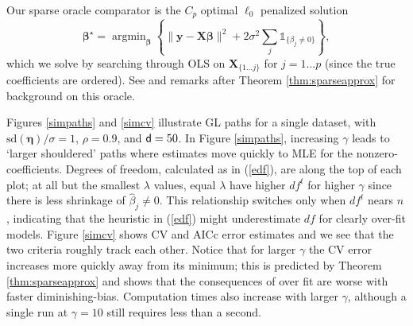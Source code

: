 \documentclass[12pt]{article}
\newcommand{\bs}[1]{\boldsymbol{#1}}
\newcommand{\mr}[1]{\mathrm{#1}}
\newcommand{\bm}[1]{\mathbf{#1}}
\newcommand{\ds}[1]{\mathds{#1}}
\DeclareMathOperator*{\argmin}{argmin}
\begin{document}
Our sparse oracle comparator is the $C_p$ optimal $\ell_0$ penalized solution
\begin{equation}\label{l0oracle}
\bs{\beta}^{\star} = \argmin_{\bs{\beta}} \left\{ \|\bm{y}-\bm{X}\bs{\beta}\|^2 + 2\sigma^2\sum_j
\ds{1}_{\{\beta_j\neq0\}}\right\},
\end{equation} which we solve by searching through
OLS on $\bm{X}_{\{1\ldots j\}}$ for $j=1\ldots p$ (since the true coefficients are ordered).
See \cite{mallows_comments_1973} and remarks after Theorem \ref{thm:sparseapprox} for background on this oracle.


Figures \ref{simpaths} and \ref{simcv} illustrate GL paths for a single
dataset, with  $\mr{sd}(\bm{\eta})/\sigma=1$, $\rho=0.9$, and ${\sf d}=50$. In Figure
\ref{simpaths}, increasing $\gamma$ leads to `larger shouldered' paths where
estimates move quickly to MLE for the nonzero-coefficients. Degrees of
freedom, calculated as in (\ref{edf}), are along the top of each plot; at all but the smallest $\lambda$ values, equal
$\lambda$ have higher $df^t$ for higher $\gamma$ since there is less shrinkage
of $\hat\beta_j\neq0$.   This relationship switches only when $df^t$
nears $n$, indicating that the heuristic in (\ref{edf}) might underestimate $df$ for clearly over-fit models.
Figure \ref{simcv} shows CV and AICc error estimates and we see that 
the two criteria roughly track each other.  Notice that
for larger $\gamma$ the CV error increases more quickly away from
its minimum; this is predicted by Theorem \ref{thm:sparseapprox} and shows that the consequences of over fit are worse with
faster diminishing-bias.  Computation times also increase with larger $\gamma$, although a
single run at $\gamma=10$ still requires less than a second.
\end{document}
